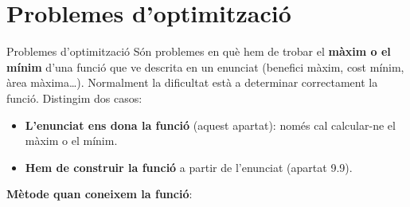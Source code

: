 \documentclass[11pt,a4paper]{article}
\makeatletter
\newcommand{\fmm}[1]{\setbox0=\hbox{$#1$}\ifdim\wd0>0.8\linewidth\def\fmmnext{\fmmdisp{#1}}\else\def\fmmnext{\mbox{\box0}}\fi\fmmnext}
\def\fmmdisp#1{\@ifnextchar.{\fmmdispp{#1}}{\@ifnextchar,{\fmmdispc{#1}}{\@ifnextchar;{\fmmdisps{#1}}{\fmdisp{#1}}}}}
\def\fmmdispp#1.{\fmdisp{#1\,.}}\def\fmmdispc#1,{\fmdisp{#1\,,}}\def\fmmdisps#1;{\fmdisp{#1\,;}}
\newcommand{\fmdisp}[1]{\[\setbox2=\hbox{$\displaystyle #1$}\ifdim\wd2>\linewidth\resizebox{\linewidth}{!}{\box2}\else\box2\fi\]}
\newcommand{\fmuline}[1]{\textbf{\color{fmaccent}#1}}
\makeatother
\begin{document}
\Needspace{5.7cm}
\section{Problemes d'optimització}\hypertarget{sec9}{}
\begin{fmdef}{Problemes d'optimització}
Són problemes en què hem de trobar el \textbf{màxim o el mínim} d'una funció que ve descrita en un enunciat (benefici màxim, cost mínim, àrea màxima\dots{}). Normalment la dificultat està a determinar correctament la funció. Distingim dos casos:

\begin{itemize}
\item \textbf{L'enunciat ens dona la funció} (aquest apartat): només cal calcular-ne el màxim o el mínim.
\item \textbf{Hem de construir la funció} a partir de l'enunciat (apartat 9.9).
\end{itemize}

\fmuline{Mètode quan coneixem la funció}:

\end{fmdef}
\end{document}
